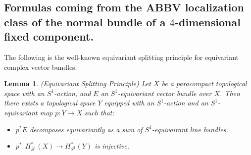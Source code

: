 \documentclass[12pt]{article}
\newtheorem{lemma}[theorem]{Lemma}
\begin{document}
\subsection{Formulas coming from the ABBV localization class of the normal bundle of a $4$-dimensional fixed component.}

The following is the well-known equivariant splitting principle for equivariant complex vector bundles.
\begin{lemma} \label{eqsplit}
(Equivariant Splitting Principle) Let $X$ be a paracompact topological space with an $S^1$-action, and $E$ an $S^1$-equivariant vector bundle over $X$. Then there exists a topological space $Y$ equipped with an $S^1$-action and an $S^1$-equivariant map $p: Y \rightarrow X$ such that: 
\begin{itemize}
\item $p^{*}E$ decomposes equivariantly as a sum of $S^1$-equivairant line bundles.
\item $p^*: H^{*}_{S^1}(X) \rightarrow H^{*}_{S^1}(Y)$ is injective.
\end{itemize}
\end{lemma}
\end{document}
